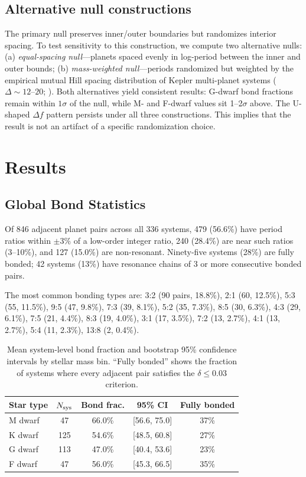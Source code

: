 \documentclass[twocolumn,usenatbib]{mnras}
\begin{document}
\subsection{Alternative null constructions}
\label{sec:null_robustness}
The primary null preserves inner/outer boundaries but randomizes interior
spacing. To test sensitivity to this construction, we compute two alternative
nulls: (a) \textit{equal-spacing null}---planets spaced evenly in log-period
between the inner and outer bounds; (b) \textit{mass-weighted null}---periods
randomized but weighted by the empirical mutual Hill spacing distribution of
Kepler multi-planet systems ($\Delta \sim 12$--$20$;
\citet{puwu2015}). Both alternatives yield consistent results: G-dwarf bond
fractions remain within $1\sigma$ of the null, while M- and F-dwarf values sit
1--2$\sigma$ above. The U-shaped $\Delta f$ pattern persists under all three
constructions. This implies that the result is not an artifact of a specific
randomization choice.

\section{Results}
\label{sec:results}

\subsection{Global Bond Statistics}

Of 846 adjacent planet pairs across all 336 systems, 479 (56.6\%) have period
ratios within $\pm 3\%$ of a low-order integer ratio, 240 (28.4\%) are near
such ratios (3--10\%), and 127 (15.0\%) are non-resonant. Ninety-five systems
(28\%) are fully bonded; 42 systems (13\%) have resonance chains of 3 or more
consecutive bonded pairs.

The most common bonding types are: 3:2 (90 pairs, 18.8\%), 2:1 (60, 12.5\%),
5:3 (55, 11.5\%), 9:5 (47, 9.8\%), 7:3 (39, 8.1\%), 5:2 (35, 7.3\%),
8:5 (30, 6.3\%), 4:3 (29, 6.1\%), 7:5 (21, 4.4\%), 8:3 (19, 4.0\%),
3:1 (17, 3.5\%), 7:2 (13, 2.7\%), 4:1 (13, 2.7\%), 5:4 (11, 2.3\%),
13:8 (2, 0.4\%).

\begin{table}
\centering
\caption{Mean system-level bond fraction and bootstrap 95\% confidence
intervals by stellar mass bin. ``Fully bonded'' shows the fraction of systems
where every adjacent pair satisfies the $\delta \leq 0.03$ criterion.}
\label{tab:ushape}
\begin{tabular}{lcccc}
\hline
Star type & $N_{\rm sys}$ & Bond frac. & 95\% CI & Fully bonded\\
\hline
M dwarf & 47 & 66.0\% & [56.6, 75.0] & 37\%\\
K dwarf & 125 & 54.6\% & [48.5, 60.8] & 27\%\\
G dwarf & 113 & 47.0\% & [40.4, 53.6] & 23\%\\
F dwarf & 47 & 56.0\% & [45.3, 66.5] & 35\%\\
\hline
\end{tabular}
\end{table}
\end{document}
